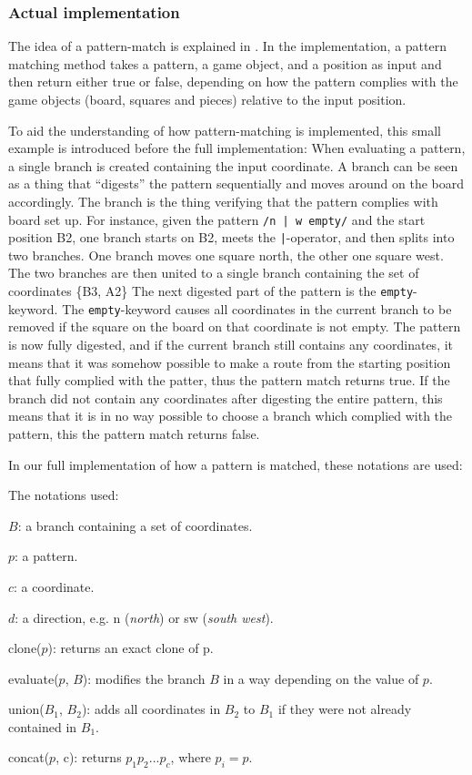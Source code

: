 \subsubsection{Actual implementation}
The idea of a pattern-match is explained in . In the implementation, a pattern matching method takes a pattern, a game object, and a position as input and then return either true or false, depending on how the pattern complies with the game objects (board, squares and pieces) relative to the input position.

To aid the understanding of how pattern-matching is implemented, this small example is introduced before the full implementation: 
When evaluating a pattern, a single branch is created containing the input coordinate. A branch can be seen as a thing that ``digests'' the pattern sequentially and moves around on the board accordingly. The branch is the thing verifying that the pattern complies with board set up. For instance, given the pattern \texttt{/n | w empty/} and the start position B2, one branch starts on B2, meets the \texttt{|}-operator, and then splits into two branches. One branch moves one square north, the other one square west. The two branches are then united to a single branch containing the set of coordinates \{B3, A2\} The next digested part of the pattern is the \texttt{empty}-keyword. The \texttt{empty}-keyword causes all coordinates in the current branch to be removed if the square on the board on that coordinate is not empty. The pattern is now fully digested, and if the current branch still contains any coordinates, it means that it was somehow possible to make a route from the starting position that fully complied with the patter, thus the pattern match returns true. If the branch did not contain any coordinates after digesting the entire pattern, this means that it is in no way possible to choose a branch which complied with the pattern, this the pattern match returns false.

In our full implementation of how a pattern is matched, these notations are used:

The notations used:
\begin{dlist}
\item $B$: a branch containing a set of coordinates.
\item $p$: a pattern.
\item $c$: a coordinate.
\item $d$: a direction, e.g. n (\textit{north}) or sw (\textit{south west}).
\item clone($p$): returns an exact clone of p.
\item evaluate($p$, $B$): modifies the branch $B$ in a way depending on the value of $p$.
\item union($B_1$, $B_2$): adds all coordinates in $B_2$ to $B_1$ if they were not already contained in $B_1$. 
\item concat($p$, c): returns $p_1 p_2 ... p_c$, where $p_i = p$.
\end{dlist}


